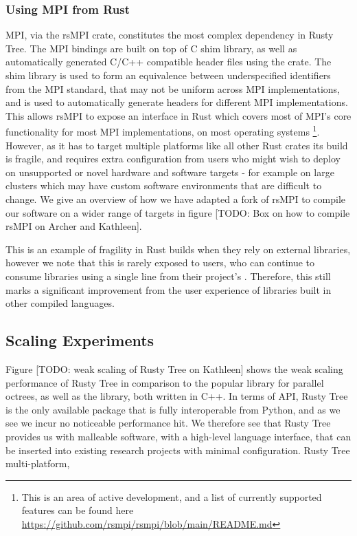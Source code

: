 \subsubsection*{Using MPI from Rust}

MPI, via the rsMPI crate, constitutes the most complex dependency in Rusty Tree. The MPI bindings are built on top of C shim library, as well as automatically generated C/C++ compatible header files using the  crate. The shim library is used to form an equivalence between underspecified identifiers from the MPI standard, that may not be uniform across MPI implementations, and  is used to automatically generate headers for different MPI implementations. This allows rsMPI to expose an interface in Rust which covers most of MPI's core functionality for most MPI implementations, on most operating systems \footnote{This is an area of active development, and a list of currently supported features can be found here \url{https://github.com/rsmpi/rsmpi/blob/main/README.md}}. However, as it has to target multiple platforms like all other Rust crates its build is fragile, and requires extra configuration from users who might wish to deploy on unsupported or novel hardware and software targets - for example on large clusters which may have custom software environments that are difficult to change. We give an overview of how we have adapted a fork of rsMPI to compile our software on a wider range of targets in figure [TODO: Box on how to compile rsMPI on Archer and Kathleen].

This is an example of fragility in Rust builds when they rely on external libraries, however we note that this is rarely exposed to users, who can continue to consume libraries using a single line from their project's . Therefore, this still marks a significant improvement from the user experience of libraries built in other compiled languages.

\subsection*{Scaling Experiments}

Figure [TODO: weak scaling of Rusty Tree on Kathleen] shows the weak scaling performance of Rusty Tree in comparison to the popular  library for parallel octrees, as well as the  library, both written in C++. In terms of API, Rusty Tree is the only available package that is fully interoperable from Python, and as we see we incur no noticeable performance hit. We therefore see that Rusty Tree provides us with malleable software, with a high-level language interface, that can be inserted into existing research projects with minimal configuration. Rusty Tree multi-platform,

